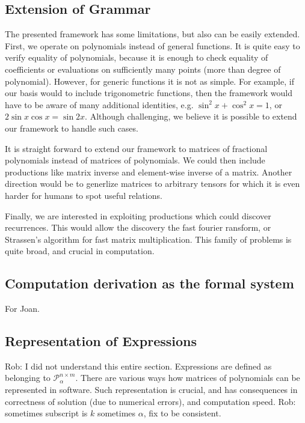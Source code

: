 \subsection{Extension of Grammar}
The presented framework has some limitations, but also can be easily extended. First,
we operate on polynomials instead of general functions. It is quite easy to verify
equality of polynomials, because it is enough to check equality of coefficients or
evaluations on sufficiently many points (more than degree of
polynomial). However, for generic functions
it is not as simple. For example, if our basis would to include trigonometric functions, then the
framework would have to be aware of many additional identities,
e.g. $\sin^2{x} + \cos^2{x} = 1$, or $2\sin x \cos x = \sin
2x$. Although challenging, we believe it is possible to extend our
framework to handle such cases. 

It is straight forward to extend our framework to matrices of fractional
polynomials instead of matrices of polynomials.  We could
then include productions like matrix inverse and element-wise inverse of
a matrix.  Another direction would be to generlize matrices to arbitrary tensors
for which it is even harder for humans to spot useful relations.

Finally, we are interested in exploiting productions which could discover 
recurrences. This would allow the discovery the fast fourier ransform, or
Strassen's algorithm for fast matrix multiplication. This family of problems is quite broad,
and crucial in computation.

\subsection{Computation derivation as the formal system}

For Joan.

\subsection{Representation of Expressions}
Rob: I did not understand this entire section.
Expressions are defined as belonging to $\mathcal{P}^{n \times m}_\alpha$. There are various
ways how matrices of polynomials can be represented in software. Such representation is crucial, and has consequences in
 correctness of solution (due to numerical errors), and computation speed.
Rob: sometimes subscript is $k$ sometimes $\alpha$, fix to be
consistent. 


